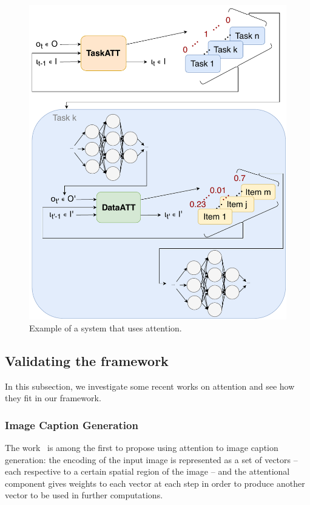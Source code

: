 \documentclass[12pt]{article}
\begin{document}
\begin{figure}[H]
    \centering
    \includegraphics[width=0.7\linewidth]{./img/att_blocks_example.pdf}
    \caption{Example of a system that uses attention.}
\label{fig:attsystem}
\end{figure}

\subsection{Validating the framework}
In this subsection, we investigate some recent works on attention and see how they fit in our framework.

\subsubsection{Image Caption Generation}
The work~\cite{ref:show-attend-tell} is among the first to propose using
attention to image caption generation: the encoding of the input image is
represented as a set of vectors -- each respective to a certain spatial region of the image --
and the attentional component gives weights to each vector at each step in order to produce another
vector to be used in further computations.
\end{document}
